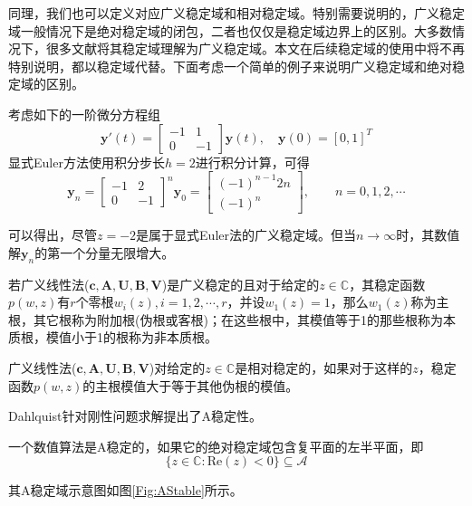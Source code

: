 同理，我们也可以定义对应广义稳定域和相对稳定域。特别需要说明的，广义稳定域一般情况下是绝对稳定域的闭包，二者也仅仅是稳定域边界上的区别。大多数情况下，很多文献将其稳定域理解为广义稳定域。本文在后续稳定域的使用中将不再特别说明，都以稳定域代替。下面考虑一个简单的例子\cite{李寿佛2010}来说明广义稳定域和绝对稳定域的区别。

考虑如下的一阶微分方程组
\begin{equation}
\bm{y}'(t)=\begin{bmatrix}
-1 & 1\\ 0 & -1
\end{bmatrix}\bm{y}(t),\quad \bm{y}(0)=[0,1]^T
\end{equation}
显式Euler方法使用积分步长$h=2$进行积分计算，可得
\begin{equation}
\bm{y}_n=\begin{bmatrix}
-1 & 2\\ 0 & -1
\end{bmatrix}^n\bm{y}_0=\begin{bmatrix}
(-1)^{n-1}2n\\ (-1)^n
\end{bmatrix},\qquad n=0,1,2,\cdots
\end{equation}

可以得出，尽管$z=-2$是属于显式Euler法的广义稳定域。但当$n\to\infty$时，其数值解$\bm{y}_n$的第一个分量无限增大。

\begin{definition}
若广义线性法($\bm{c},\bm{A},\bm{U},\bm{B},\bm{V}$)是广义稳定的且对于给定的$z\in\mathbb{C}$，其稳定函数$p(w,z)$有$r$个零根$w_i(z),i=1,2,\cdots,r$，并设$w_1(z)=1$，那么$w_1(z)$称为主根，其它根称为附加根(伪根或客根)；在这些根中，其模值等于1的那些根称为本质根，模值小于1的根称为非本质根\cite{李寿佛2010}。
\end{definition}
\begin{definition}[相对稳定性]
广义线性法($\bm{c},\bm{A},\bm{U},\bm{B},\bm{V}$)对给定的$z\in\mathbb{C}$是相对稳定的\cite{Gear1971a,袁新鼎1987}，如果对于这样的$z$，稳定函数$p(w,z)$的主根模值大于等于其他伪根的模值。
\end{definition}
Dahlquist针对刚性问题求解提出了A稳定性\cite{Dahlquist1963}。
\begin{definition}[A稳定性]
一个数值算法是A稳定的\cite{Dahlquist1963,Jackiewicz2009,ErnstHairer1996}，如果它的绝对稳定域包含复平面的左半平面，即
\begin{equation}
\{z\in\mathbb{C}:\text{Re}(z)<0\}\subseteq\mathcal{A}
\end{equation}
\end{definition}
其A稳定域示意图如图\ref{Fig:AStable}所示。
\begin{figure}[htpb]
\centering
{}
\end{figure}

